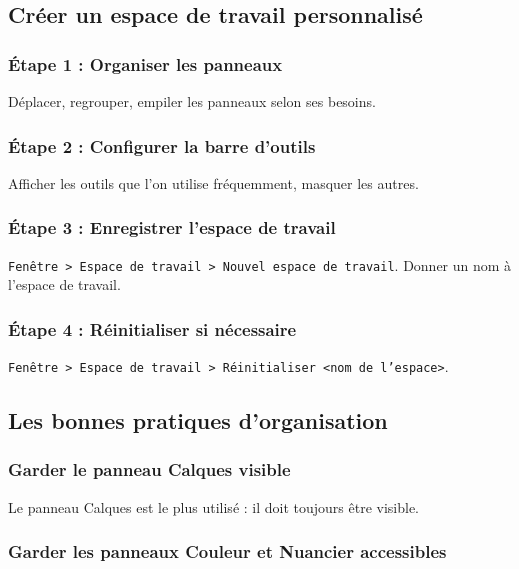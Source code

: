 \subsection{Créer un espace de travail personnalisé}

\subsubsection{Étape 1 : Organiser les panneaux}

Déplacer, regrouper, empiler les panneaux selon ses besoins.

\subsubsection{Étape 2 : Configurer la barre d'outils}

Afficher les outils que l'on utilise fréquemment, masquer les autres.

\subsubsection{Étape 3 : Enregistrer l'espace de travail}

\texttt{Fenêtre > Espace de travail > Nouvel espace de travail}. Donner un nom à l'espace de travail.

\subsubsection{Étape 4 : Réinitialiser si nécessaire}

\texttt{Fenêtre > Espace de travail > Réinitialiser <nom de l'espace>}.

\subsection{Les bonnes pratiques d'organisation}

\subsubsection{Garder le panneau Calques visible}

Le panneau Calques est le plus utilisé : il doit toujours être visible.

\subsubsection{Garder les panneaux Couleur et Nuancier accessibles}

